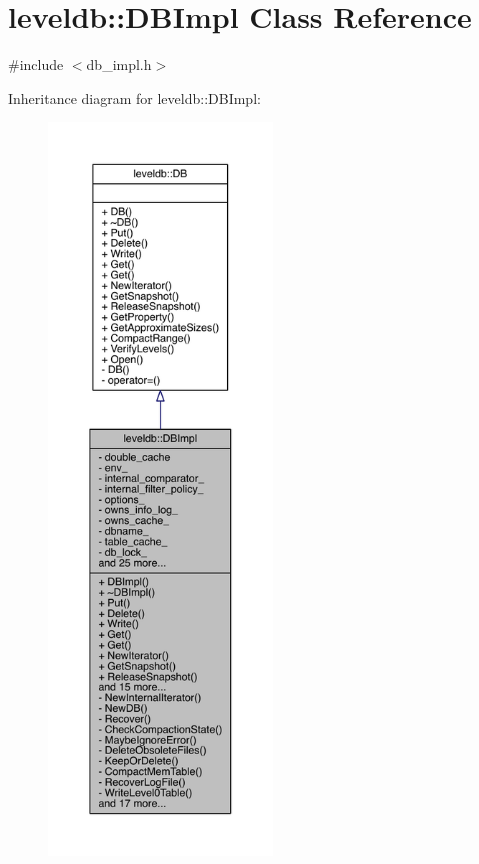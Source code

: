 \hypertarget{classleveldb_1_1_d_b_impl}{}\section{leveldb\+:\+:D\+B\+Impl Class Reference}
\label{classleveldb_1_1_d_b_impl}


{\ttfamily \#include $<$db\+\_\+impl.\+h$>$}



Inheritance diagram for leveldb\+:\+:D\+B\+Impl\+:\nopagebreak
\begin{figure}[H]
\begin{center}
\leavevmode
\includegraphics[height=550pt]{classleveldb_1_1_d_b_impl__inherit__graph}
\end{center}
\end{figure}


